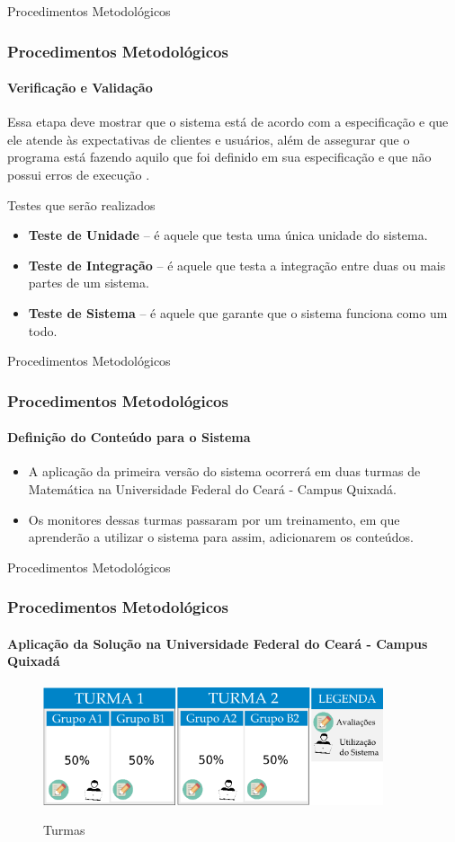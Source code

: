 \documentclass[aspectratio=169]{beamer}
\begin{document}
\begin{frame}{Procedimentos Metodológicos}
\frametitle{Procedimentos Metodológicos}
\framesubtitle{Verificação e Validação}

Essa etapa deve mostrar que o sistema está de acordo com a especificação e que ele atende às expectativas de clientes e usuários, além de assegurar que o programa está fazendo aquilo que foi definido 
em sua especificação e que não possui erros de execução \cite{aguiar2012requisitos}.

\begin{block}{Testes que ser\~ao realizados}
	\begin{itemize}
	 \item \textbf{Teste de Unidade} – é aquele que testa uma única unidade do sistema.
	 \item \textbf{Teste de Integração} – é aquele que testa a integração entre duas ou mais partes de um sistema.
	 \item \textbf{Teste de Sistema} – é aquele que garante que o sistema funciona como um todo.
	\end{itemize}

\end{block}


\end{frame}


\begin{frame}{Procedimentos Metodológicos}
\frametitle{Procedimentos Metodológicos}
\framesubtitle{Definição do Conteúdo para o Sistema}
	\begin{itemize}
	 \item A aplicação da primeira versão do sistema ocorrer\'a em duas turmas de Matemática na Universidade
Federal do Ceará - Campus Quixadá.
	\item Os monitores dessas turmas passaram por um treinamento, em que aprender\~ao a utilizar o sistema para assim, adicionarem os conte\'udos.
	\end{itemize}

\end{frame}


\begin{frame}{Procedimentos Metodológicos}
\frametitle{Procedimentos Metodológicos}
\framesubtitle{Aplicação da Solução na Universidade Federal do Ceará - Campus Quixadá}

\begin{figure}[H]
\centering
\caption{Turmas}
\includegraphics[width=10cm]{figuras/aplicacao.png}
\label{figura_aplicacao}
\end{figure}

\end{frame}
\end{document}
